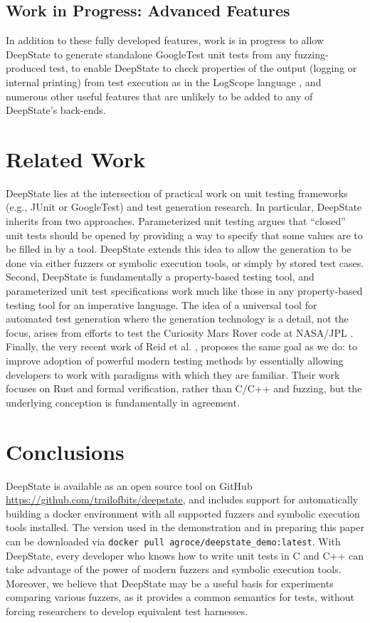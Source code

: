 \documentclass[sigconf]{acmart}
\begin{document}
\subsection{Work in Progress: Advanced Features}

In addition to these fully developed features, work is in progress to allow DeepState to generate standalone GoogleTest unit tests from any fuzzing-produced test, to enable DeepState to check properties of the output (logging or internal printing) from test execution as in the LogScope language \cite{scriptstospecs}, and numerous other useful features that are unlikely to be added to any of DeepState's back-ends.

\section{Related Work}

DeepState lies at the intersection of practical work on unit testing frameworks (e.g., JUnit or GoogleTest) and test generation research.  In particular, DeepState inherits from two approaches.  Parameterized unit testing \cite{ParamUnit,UnitMeister} argues that ``closed'' unit tests should be opened by providing a way to specify that some values are to be filled in by a tool.  DeepState extends this idea to allow the generation to be done via either fuzzers or symbolic execution tools, or simply by stored test cases.  Second, DeepState is fundamentally a property-based testing \cite{ClaessenH00}  tool, and parameterized unit test specifications work much like those in any property-based testing tool for an imperative language.  The idea of a universal tool for automated test generation where the generation technology is a detail, not the focus, arises from efforts to test the Curiosity Mars Rover code at NASA/JPL \cite{AMAI,WODACommon,WODA08}.  Finally, the very recent work of Reid et al. \cite{reid2020making}, proposes the same goal as we do: to improve adoption of powerful modern testing methods by essentially allowing developers to work with paradigms with which they are familiar.  Their work focuses on Rust and formal verification, rather than C/C++ and fuzzing, but the underlying conception is fundamentally in agreement.

\section{Conclusions}

DeepState is available as an open source tool on GitHub \url{https://github.com/trailofbits/deepstate}, and includes support for automatically building a docker environment with all supported fuzzers and symbolic execution tools installed.  The version used in the demonstration and in preparing this paper can be downloaded via {\tt docker pull agroce/deepstate\_demo:latest}.  With DeepState, every developer who knows how to write unit tests in C and C++ can take advantage of the power of modern fuzzers and symbolic execution tools.  Moreover, we believe that DeepState may be a useful basis for experiments comparing various fuzzers, as it provides a common semantics for tests, without forcing researchers to develop equivalent test harnesses.
\end{document}
